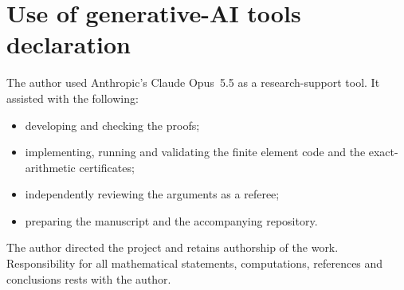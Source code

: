 \section*{Use of generative-AI tools declaration}
The author used Anthropic's Claude Opus~5.5 as a research-support tool. It assisted with the following:
\begin{itemize}
\item developing and checking the proofs;
\item implementing, running and validating the finite element code and the exact-arithmetic certificates;
\item independently reviewing the arguments as a referee;
\item preparing the manuscript and the accompanying repository.
\end{itemize}
The author directed the project and retains authorship of the work. Responsibility for all mathematical statements, computations, references and conclusions rests with the author.
